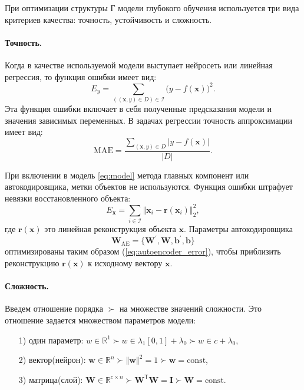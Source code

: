 \documentclass[12pt, twoside]{article}
\newcommand{\xb}{{\mathbf{x}}}
\newcommand{\x}{{\mathbf{x}}}
\newcommand{\wvec}{{\mathbf{W}}}
\newcommand{\w}{{\mathbf{W}}}
\newcommand{\wm}{{\mathbf{w}}}
\begin{document}
При оптимизации структуры Г модели глубокого обучения используется три вида критериев качества: точность, устойчивость и сложность.

\paragraph{Точность.}

Когда в качестве используемой модели выступает нейросеть или линейная регрессия, 
то функция ошибки имеет вид:
\begin{equation}\label{eq:mce}
E_y= \sum_{((\xb,y) \in D)\in\mathcal{I}}\big(y-f(\xb)\big)^2.
\end{equation}
Эта функция ошибки включает в себя полученные предсказания модели и значения зависимых переменных. В задачах регрессии точность аппроксимации имеет вид: 
\begin{equation}\label{eq106}
\text{MAE} =\frac{ \sum\limits_{(\xb,y) \in D}|y-f(\xb)|}{|D|}.
\end{equation}

При включении в модель \eqref{eq:model} метода главных компонент или автокодировщика, метки объектов не используются. Функция ошибки штрафует невязки восстановленного объекта:
\begin{equation}\label{eq:autoencoder_error}
E_\mathbf{x} = \sum_{i\in\mathcal{I}}\left\Vert{\xb_i-\mathbf{r}(\xb_i)}\right\Vert_2^2,
\end{equation}
где $\mathbf{r}(\x)$  это линейная реконструкция объекта $\x$. 
Параметры автокодировщика
\begin{equation}
\textbf{W}_{\text{AE}} = \{\w^{'},\w,\mathbf{b}^{'},\mathbf{b}\}
\end{equation}
оптимизированы таким образом (\ref{eq:autoencoder_error}), чтобы приблизить реконструкцию $\mathbf{r}(\x)$ к исходному вектору $\x$.



\paragraph{Сложность.}\label{complexity}
Введем отношение порядка $\succ$ на множестве значений сложности. Это отношение задается множеством параметров модели:
\begin{enumerate}
\item[1)] один параметр: $w\in \mathbb{R}^1 \succ w \in \lambda_1 [0,1] +\lambda_0 \succ w\in c +\lambda_0$,
\item[2)] вектор(нейрон): $\wm\in \mathbb{R}^n \succ \left\Vert \wm \right\Vert^2 =1 \succ \wm= \text{const}$,
\item[3)] матрица(слой): $\wvec\in \mathbb{R}^{c{\times}n} \succ \wvec^\mathsf{T}\wvec = \mathbf{I} \succ \wvec= \text{const}$.
\end{enumerate}
\end{document}

